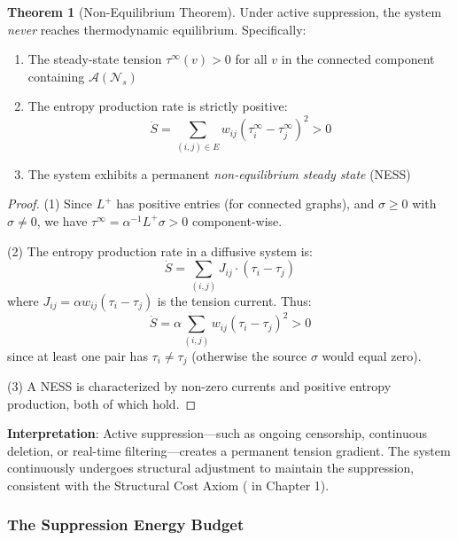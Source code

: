 \documentclass[12pt,a4paper]{article}
\theoremstyle{definition}
\newtheorem{theorem}{Theorem}[section]
\theoremstyle{remark}
\newcommand{\NS}{\mathcal{N}_s}          %
\newcommand{\CA}{\mathcal{A}}            %
\begin{document}
\begin{theorem}[Non-Equilibrium Theorem]
\label{thm:non-equilibrium}
Under active suppression, the system \emph{never} reaches thermodynamic equilibrium. Specifically:
\begin{enumerate}
    \item The steady-state tension $\tau^{\infty}(v) > 0$ for all $v$ in the connected component containing $\CA(\NS)$
    \item The entropy production rate is strictly positive:
    \begin{equation}
        \dot{S} = \sum_{(i,j) \in E} w_{ij} \left( \tau_i^{\infty} - \tau_j^{\infty} \right)^2 > 0
    \end{equation}
    \item The system exhibits a permanent \emph{non-equilibrium steady state} (NESS)
\end{enumerate}
\end{theorem}

\begin{proof}
(1) Since $L^+$ has positive entries (for connected graphs), and $\sigma \geq 0$ with $\sigma \neq 0$, we have $\tau^{\infty} = \alpha^{-1} L^+ \sigma > 0$ component-wise.

(2) The entropy production rate in a diffusive system is:
\begin{equation}
    \dot{S} = \sum_{(i,j)} J_{ij} \cdot (\tau_i - \tau_j)
\end{equation}
where $J_{ij} = \alpha w_{ij}(\tau_i - \tau_j)$ is the tension current. Thus:
\begin{equation}
    \dot{S} = \alpha \sum_{(i,j)} w_{ij} (\tau_i - \tau_j)^2 > 0
\end{equation}
since at least one pair has $\tau_i \neq \tau_j$ (otherwise the source $\sigma$ would equal zero).

(3) A NESS is characterized by non-zero currents and positive entropy production, both of which hold.
\end{proof}

\textbf{Interpretation}: Active suppression---such as ongoing censorship, continuous deletion, or real-time filtering---creates a permanent tension gradient. The system continuously undergoes structural adjustment to maintain the suppression, consistent with the Structural Cost Axiom ( in Chapter 1).

\subsubsection{The Suppression Energy Budget}
\end{document}
